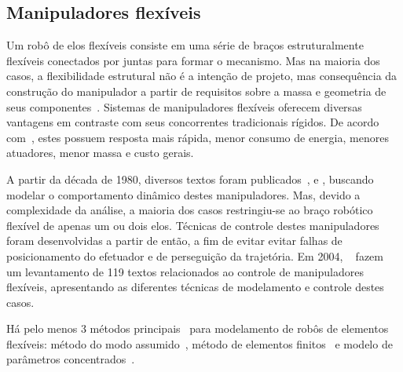 \subsection{Manipuladores flexíveis}


Um robô de elos flexíveis consiste em uma série de braços estruturalmente
flexíveis conectados por juntas para formar o mecanismo. Mas na maioria dos
casos, a flexibilidade estrutural não é a intenção de projeto, mas consequência
da construção do manipulador a partir de requisitos sobre a massa e geometria de
seus componentes~\cite{moallem2000flexible}.
Sistemas de manipuladores flexíveis oferecem diversas vantagens em contraste com
seus concorrentes tradicionais rígidos. De acordo com~\cite{tokhi2008flexible},
estes possuem resposta mais rápida, menor consumo de energia, menores atuadores,
menor massa e custo gerais.


A partir da década de 1980, diversos textos foram
publicados~\cite{sunada1983dynamic}, \cite{bayo1987finite} e
\cite{yang1988dynamic}, buscando modelar o comportamento dinâmico destes
manipuladores. Mas, devido a complexidade da análise, a maioria dos casos
restringiu-se ao braço robótico flexível de apenas um ou dois elos. Técnicas de
controle destes manipuladores foram desenvolvidas a partir de então, a fim de
evitar evitar falhas de posicionamento do efetuador e de perseguição da
trajetória.
Em 2004, ~\citet{benosman2004control} fazem um levantamento de 119 textos
relacionados ao controle de manipuladores flexíveis, apresentando as diferentes
técnicas de modelamento e controle destes casos.

Há pelo menos 3 métodos principais~\cite{dwivedy2006dynamic} para modelamento de
robôs de elementos flexíveis: método do modo
assumido~\cite{robinett2012flexible}, método de elementos
finitos~\cite{bricout1990finite} e modelo de parâmetros
concentrados~\cite{zhu1999simulation}.

